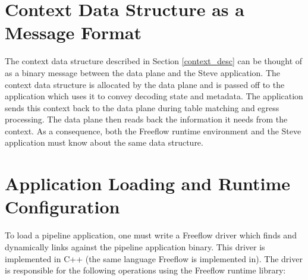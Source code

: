 \section{Context Data Structure as a Message Format}

The context data structure described in Section \ref{context_desc} can be thought of as a binary message between the data plane and the Steve application. 
The context data structure is allocated by the data plane and is passed off to the application which uses it to convey decoding state and metadata.
The application sends this context back to the data plane during table matching and egress processing. The data plane then reads back the information it needs from the context.
As a consequence, both the Freeflow runtime environment and the Steve application must know about the same data structure. 

\section{Application Loading and Runtime Configuration} \label{config_guide}

To load a pipeline application, one must write a Freeflow driver which finds and dynamically links against the pipeline application binary. This driver is implemented in C++ (the same language Freeflow is implemented in).
The driver is responsible for the following operations using the Freeflow runtime library:

